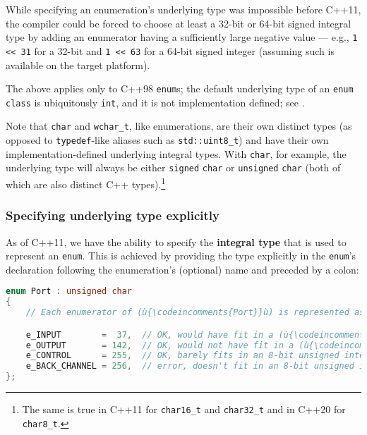 While specifying an enumeration’s underlying type was impossible before C++11, the compiler could be forced to choose at least a 32-bit or 64-bit signed integral type by adding an enumerator having a sufficiently large negative value --- e.g., \lstinline!1 << 31! for a 32-bit and \lstinline!1 << 63! for a 64-bit signed integer (assuming such is available on the target platform).

The above applies only to C++98 \lstinline!enum!s; the default underlying type of an \lstinline!enum! \lstinline!class! is ubiquitously \lstinline!int!, and it is not implementation defined; see .

Note that \lstinline!char! and \lstinline!wchar_t!, like enumerations, are their own distinct types (as opposed to \lstinline!typedef!-like aliases such as \lstinline!std::uint8_t!) and have their own implementation-defined underlying integral types. With \lstinline!char!, for example, the underlying type will always be either \lstinline!signed! \lstinline!char! or \lstinline!unsigned! \lstinline!char! (both of which are also distinct C++ types).{\cprotect\footnote{The same is true in C++11 for
\texttt{char16\_t} and \texttt{char32\_t} and in C++20 for
  \texttt{char8\_t}.}}

\subsubsection[Specifying underlying type explicitly]{Specifying underlying type explicitly}\label{specifying-underlying-type-explicitly}

As of C++11, we have the ability to specify the \textbf{integral type}
that is used to represent an \texttt{enum}. This is achieved by
providing the type explicitly in the \texttt{enum}'s declaration
following the enumeration's (optional) name and preceded by a colon:

\begin{lstlisting}[language=C++]
enum Port : unsigned char
{
    // Each enumerator of (ù{\codeincomments{Port}}ù) is represented as an (ù{\codeincomments{unsigned char}}ù) type.

    e_INPUT        =  37,  // OK, would have fit in a (ù{\codeincomments{signed char}}ù) too
    e_OUTPUT       = 142,  // OK, would not have fit in a (ù{\codeincomments{signed char}}ù)
    e_CONTROL      = 255,  // OK, barely fits in an 8-bit unsigned integer
    e_BACK_CHANNEL = 256,  // error, doesn't fit in an 8-bit unsigned integer
};
\end{lstlisting}

